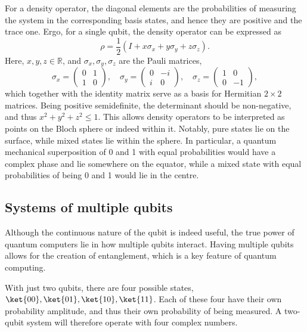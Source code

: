 For a density operator, the diagonal elements are the probabilities of measuring the system in the corresponding basis states, and hence they are positive and the trace one.
Ergo, for a single qubit, the density operator can be expressed as
\begin{equation}
    \rho = \frac{1}{2} \left(I + x \sigma_x + y \sigma_y + z \sigma_z\right).
\end{equation}
Here, $x, y, z \in \mathbb{R}$, and $\sigma_x, \sigma_y, \sigma_z$ are the Pauli matrices,
\begin{equation}
    \sigma_x = \begin{pmatrix} 0 & 1 \\ 1 & 0 \end{pmatrix}, \quad
    \sigma_y = \begin{pmatrix} 0 & -i \\ i & 0 \end{pmatrix}, \quad
    \sigma_z = \begin{pmatrix} 1 & 0 \\ 0 & -1 \end{pmatrix},
    \label{eq:pauli}
\end{equation}
which together with the identity matrix serve as a basis for Hermitian $2\times 2$ matrices.
Being positive semidefinite, the determinant should be non-negative, and thus $x^2 + y^2 + z^2 \leq 1$.
This allows density operators to be interpreted as points on the Bloch sphere or indeed within it.
Notably, pure states lie on the surface, while mixed states lie within the sphere.
In particular, a quantum mechanical superposition of 0 and 1 with equal probabilities would have a complex phase and lie somewhere on the equator, while a mixed state with equal probabilities of being 0 and 1 would lie in the centre.

\subsection{Systems of multiple qubits}
Although the continuous nature of the qubit is indeed useful, the true power of quantum computers lie in how multiple qubits interact.
Having multiple qubits allows for the creation of entanglement, which is a key feature of quantum computing.

With just two qubits, there are four possible states, $\ket{00}, \ket{01}, \ket{10}, \ket{11}$.
Each of these four have their own probability amplitude, and thus their own probability of being measured.
A two-qubit system will therefore operate with four complex numbers.

